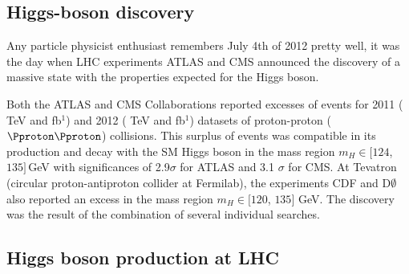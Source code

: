 \begin{comment}
In the SM, fundamental particles acquire mass through their interactions with the Higgs fields. It is important to note that not all mass is related to the Higgs mechanism.
For instance, the mass of the proton does not came from the interaction of its components with the Higgs but from the kinetic energy of the particles that compose the proton.
\end{comment}

\subsection{Higgs-boson discovery}
\label{sec:Chap1:HiggsPhys_discovery}
Any particle physicist enthusiast remembers July 4th of 2012 pretty well, it was the day when LHC 
experiments ATLAS \cite{20121_ATLAS_HiggsDiscovery} 
and CMS  \cite{201230_CMS_HiggsDiscovery} 
announced the discovery of a massive state \PH with the properties expected for the Higgs boson.

Both the ATLAS and CMS Collaborations reported excesses of events for 2011 ( TeV and  fb$^{1}$) 
and 2012 ( TeV and  fb$^{1}$)  datasets of proton-proton ($\Pproton \Pproton$) collisions.
This surplus of events was compatible in its production and decay with the SM Higgs boson in the
mass region $m_{H}\in [124$, $135]\,$GeV with significances of 2.9$\sigma$ for ATLAS and 3.1 $\sigma$ for CMS.
At Tevatron (circular proton-antiproton collider at Fermilab), the experiments CDF \cite{CDF:2012jmx} and D$\emptyset$
 \cite{D0:2012jgw} also reported
an excess in the mass region $m_{H}\in [120$, $135]$ GeV.
The discovery was the result of the combination of several  individual searches.

\subsection{Higgs boson production at LHC}
\label{sec:Chap1:Higgs_production}

